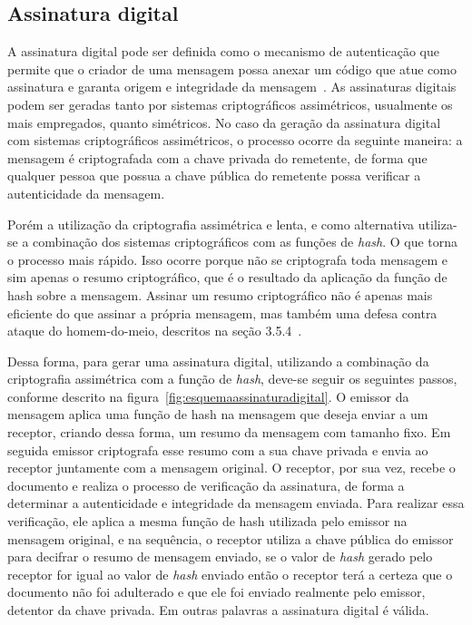 \subsection{Assinatura digital}

A assinatura digital pode ser definida como o mecanismo de autenticação que permite que o criador de uma mensagem possa anexar um código que atue como assinatura e garanta origem e integridade da mensagem~\cite{stallings2008}. As assinaturas digitais podem ser geradas tanto por sistemas criptográficos assimétricos, usualmente os mais empregados, quanto simétricos. No caso da geração da assinatura digital com sistemas criptográficos assimétricos, o processo ocorre da seguinte maneira: a mensagem é criptografada com a chave privada do remetente, de forma que qualquer pessoa que possua a chave pública do remetente possa verificar a autenticidade da mensagem.

Porém a utilização da criptografia assimétrica e lenta, e como alternativa utiliza-se a combinação dos sistemas criptográficos com as funções de \emph{hash}. O que torna o processo mais rápido. Isso ocorre porque não se criptografa toda mensagem e sim apenas o resumo criptográfico, que é o resultado da aplicação da função de hash sobre a mensagem. Assinar um resumo criptográfico não é apenas mais eficiente do que assinar a própria mensagem, mas também uma defesa contra ataque do homem-do-meio, descritos na seção 3.5.4~\cite{goodrich2013}.

Dessa forma, para gerar uma assinatura digital, utilizando a combinação da criptografia assimétrica com a função de \emph{hash}, deve-se seguir os seguintes passos, conforme descrito na figura~\ref{fig:esquemaassinaturadigital}. O emissor da mensagem aplica uma função de hash na mensagem que deseja enviar a um receptor, criando dessa forma, um resumo da mensagem com tamanho fixo. Em seguida emissor criptografa esse resumo com a sua chave privada e envia ao receptor juntamente com a mensagem original. O receptor, por sua vez, recebe o documento e realiza o processo de verificação da assinatura, de forma a determinar a autenticidade e integridade da mensagem enviada. Para realizar essa verificação, ele aplica a mesma função de hash utilizada pelo emissor na mensagem original, e na sequência, o receptor utiliza a chave pública do emissor para decifrar o resumo de mensagem enviado, se o valor de \emph{hash} gerado pelo receptor  for igual ao valor de \emph{hash} enviado então o receptor terá a certeza que o documento não foi adulterado e que ele foi enviado realmente pelo emissor, detentor da chave privada. Em outras palavras a assinatura digital é válida.

